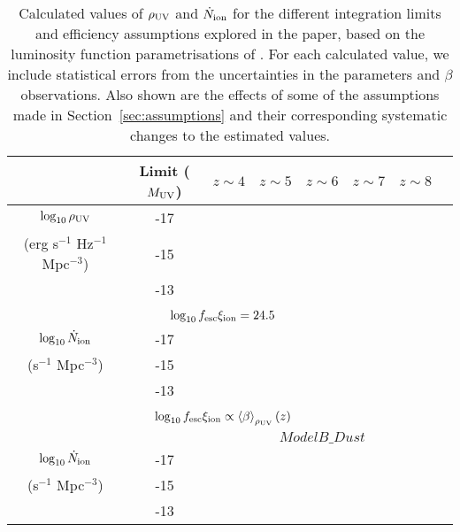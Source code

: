 \begin{table}
  \caption[Calculated values of $\rho_{\rm{UV}}$ and $\dot{N}_{\rm{ion}}$ for the different integration limits and efficiency assumptions explored in the paper, based on the luminosity function parametrisations of \citet{Bouwens:2014tx}.]{Calculated values of $\rho_{\rm{UV}}$ and $\dot{N}_{\rm{ion}}$ for the different integration limits and efficiency assumptions explored in the paper, based on the luminosity function parametrisations of \citet{Bouwens:2014tx}. For each calculated value, we include statistical errors from the uncertainties in the \citet{Schechter:1976gl} parameters and $\beta$ observations. Also shown are the effects of some of the assumptions made in Section~\ref{sec:assumptions} and their corresponding systematic changes to the estimated values.}
	\scriptsize
  \begin{tabular}{cc|cccccc}
  \hline
   & Limit ($M_{\rm{UV}}$) & $z\sim4$ & $z\sim5$ & $z\sim6$ & $z\sim7$ & $z\sim8$ & \\
   \hline
  $\log_{10} \rho_{\rm{UV}}$ 							& -17 &  \\
   (erg s$^{-1}$ Hz$^{-1}$ Mpc$^{-3}$)	& -15 &  \\
																& -13 &  \\

	 \multicolumn{7}{c}{}\\
	 \multicolumn{7}{c}{$\log_{10}f_{\rm{esc}}\xi_{\rm{ion}} = 24.5$}\\\hline
$\log_{10} \dot{N}_{\rm{ion}}$	 		& -17 &  \\
(s$^{-1}$ Mpc$^{-3}$) 				& -15 &  \\
												& -13 &  \\
												
	 \multicolumn{7}{c}{}\\
	 \multicolumn{7}{c}{$\log_{10}f_{\rm{esc}}\xi_{\rm{ion}} \propto \left \langle \beta  \right \rangle_{\rho_{\rm{UV}}}(z)$}\\ \hline
	
	  & & \multicolumn{5}{c}{$ModelB\_Dust$}\\
	  
$\log_{10} \dot{N}_{\rm{ion}}$	 		& -17 &  \\
(s$^{-1}$ Mpc$^{-3}$) 				& -15 &  \\
												& -13 &  \\
												

\end{tabular}
\end{table}
